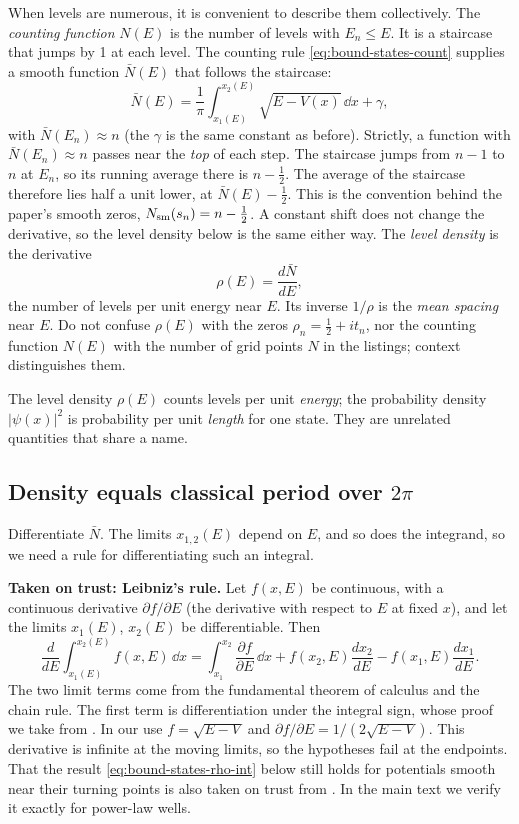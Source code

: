 When levels are numerous, it is convenient to describe them collectively. The \emph{counting function} $N(E)$ is the number of levels with $E_n\le E$. It is a staircase that jumps by 1 at each level. The counting rule \cref{eq:bound-states-count} supplies a smooth function $\bar N(E)$ that follows the staircase:
\[
\bar N(E)=\frac1\pi\int_{x_1(E)}^{x_2(E)}\sqrt{E-V(x)}\,\dd x+\gamma ,
\]
with $\bar N(E_n)\approx n$ (the $\gamma$ is the same constant as before). Strictly, a function with $\bar N(E_n)\approx n$ passes near the \emph{top} of each step. The staircase jumps from $n-1$ to $n$ at $E_n$, so its running average there is $n-\tfrac12$. The average of the staircase therefore lies half a unit lower, at $\bar N(E)-\tfrac12$. This is the convention behind the paper's smooth zeros, $N_{\mathrm{sm}}(s_n)=n-\tfrac12$. A constant shift does not change the derivative, so the level density below is the same either way. The \emph{level density} is the derivative
\begin{equation}
\rho(E)=\frac{d\bar N}{dE},
\label{eq:bound-states-rho}
\end{equation}
the number of levels per unit energy near $E$. Its inverse $1/\rho$ is the \emph{mean spacing} near $E$. Do not confuse $\rho(E)$ with the zeros $\rho_n=\tfrac12+it_n$, nor the counting function $N(E)$ with the number of grid points $N$ in the listings; context distinguishes them.

\begin{pitfall}
The level density $\rho(E)$ counts levels per unit \emph{energy}; the probability density $|\psi(x)|^2$ is probability per unit \emph{length} for one state. They are unrelated quantities that share a name.
\end{pitfall}

\subsection{Density equals classical period over $2\pi$}

Differentiate $\bar N$. The limits $x_{1,2}(E)$ depend on $E$, and so does the integrand, so we need a rule for differentiating such an integral.

\begin{beyond}
\textbf{Taken on trust: Leibniz's rule.} Let $f(x,E)$ be continuous, with a continuous derivative $\partial f/\partial E$ (the derivative with respect to $E$ at fixed $x$), and let the limits $x_1(E)$, $x_2(E)$ be differentiable. Then
\[
\frac{d}{dE}\int_{x_1(E)}^{x_2(E)}f(x,E)\,\dd x=\int_{x_1}^{x_2}\frac{\partial f}{\partial E}\,\dd x+f(x_2,E)\frac{dx_2}{dE}-f(x_1,E)\frac{dx_1}{dE}.
\]
The two limit terms come from the fundamental theorem of calculus and the chain rule. The first term is differentiation under the integral sign, whose proof we take from \cite{rhb}. In our use $f=\sqrt{E-V}$ and $\partial f/\partial E=1/(2\sqrt{E-V})$. This derivative is infinite at the moving limits, so the hypotheses fail at the endpoints. That the result \cref{eq:bound-states-rho-int} below still holds for potentials smooth near their turning points is also taken on trust from \cite{rhb}. In the main text we verify it exactly for power-law wells.
\end{beyond}

